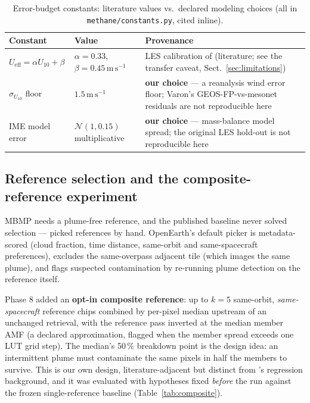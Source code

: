 \documentclass[11pt]{article}
\newcommand{\code}[1]{\texttt{\small #1}}
\begin{document}
\begin{table}[tb]
\centering\small
\caption{Error-budget constants: literature values vs.\ declared modeling
choices (all in \code{methane/constants.py}, cited inline).}
\label{tab:budget}
\begin{tabular}{@{}llp{7.1cm}@{}}
\toprule
Constant & Value & Provenance \\
\midrule
$U_{\mathrm{eff}} = \alpha U_{10} + \beta$ & $\alpha{=}0.33$,
$\beta{=}0.45\,\mathrm{m\,s^{-1}}$ & LES calibration of
\citet{varon2021} (literature; see the transfer caveat,
Sect.~\ref{sec:limitations}) \\
$\sigma_{U_{10}}$ floor & $1.5\,\mathrm{m\,s^{-1}}$ & \textbf{our choice}
--- a reanalysis wind error floor; Varon's GEOS-FP-vs-mesonet residuals
are not reproducible here \\
IME model error & $\mathcal{N}(1, 0.15)$ multiplicative & \textbf{our
choice} --- mass-balance model spread; the original LES hold-out is not
reproducible here \\
\bottomrule
\end{tabular}
\end{table}

\subsection{Reference selection and the composite-reference
experiment}\label{sec:composite}

MBMP needs a plume-free reference, and the published baseline never solved
selection --- \citet{varon2021} picked references by hand.
OpenEarth's default picker is metadata-scored (cloud fraction, time
distance, same-orbit and same-spacecraft preferences), excludes the
same-overpass adjacent tile (which images the same plume), and flags
suspected contamination by re-running plume detection on the reference
itself.

Phase 8 added an \textbf{opt-in composite reference}: up to $k{=}5$
same-orbit, \emph{same-spacecraft} reference chips combined by per-pixel
median upstream of an unchanged retrieval, with the reference pass
inverted at the median member AMF (a declared approximation, flagged when
the member spread exceeds one LUT grid step). The median's 50\,\%
breakdown point is the design idea: an intermittent plume must contaminate
the same pixels in half the members to survive. This is our own design,
literature-adjacent but distinct from \citet{ehret2022}'s regression
background, and it was evaluated with hypotheses fixed \emph{before} the
run against the frozen single-reference baseline
(Table~\ref{tab:composite}).
\end{document}
